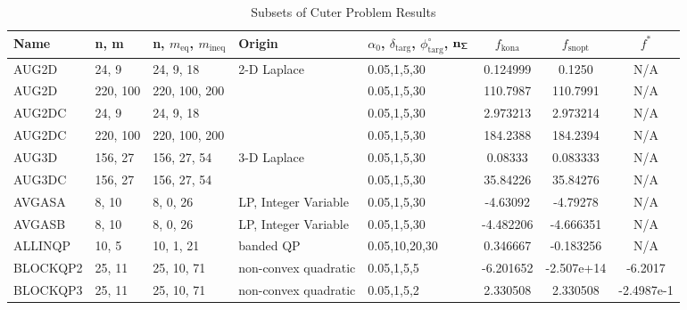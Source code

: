 \begin{landscape}
\begin{longtable}{l | l |  l  |  >{\footnotesize}p{3.5cm} | l | c | c | c  }      %
\caption{Subsets of Cuter Problem Results}\label{tab:cuter} \\
 \hline 
Name   &                 n,   m       &  n,  $m_{\text{eq}}$,  $m_{\text{ineq}}$        &     Origin      &\textbf{$\alpha_0$},  $\delta_{\text{targ}}$, $\phi^{\circ}_{\text{targ}}$,  $\mathbf{{n_{\mathsf{\Sigma}}}}$      & $ f_{\text{kona}} $   & $ f_{\text{snopt}} $ &$ f^*$    \\ \hline
AUG2D    &           24,  9         &  24,   9,  18       &    2-D Laplace   & 0.05,1,5,30   &  0.124999           &     0.1250    &      N/A                \\ \hline
AUG2D    &          220, 100   & 220, 100, 200  &                      &   0.05,1,5,30         &   110.7987          &    110.7991      &    N/A           \\ \hline
AUG2DC  &       24, 9      &   24, 9, 18       &       &     0.05,1,5,30        &    2.973213        & 2.973214    &   N/A     \\ \hline
AUG2DC  &      220, 100   &  220, 100, 200   &     &   0.05,1,5,30    & 184.2388    &   184.2394     &    N/A      \\ \hline
AUG3D  &      156, 27    & 156, 27, 54   & 3-D Laplace  &  0.05,1,5,30   & 0.08333   &   0.083333   &  N/A         \\ \hline
AUG3DC  &  156, 27  &  156, 27, 54   &    & 0.05,1,5,30 &   35.84226   &   35.84276      & N/A      \\ \hline
 AVGASA  &       8, 10   &   8, 0, 26   &   \cellcolor{blue}         LP, Integer Variable    &   0.05,1,5,30       &           -4.63092    &    -4.79278   &   N/A     \\ \hline
 AVGASB  &    8, 10  &   8, 0, 26   &   \cellcolor{blue}    LP, Integer Variable   & 0.05,1,5,30   &   -4.482206   &   -4.666351     &   N/A    \\ \hline
ALLINQP  & 10, 5   &  10, 1, 21   & banded QP  &  0.05,10,20,30 & \cellcolor{blue}0.346667  & \cellcolor{blue}-0.183256     &  N/A \\  \hline     %
BLOCKQP2   & 25, 11   & 25,  10, 71   &    non-convex quadratic & 0.05,1,5,5  & -6.201652   &  \cellcolor{yellow}  -2.507e+14    &  \cellcolor{yellow}  -6.2017   \\ \hline
BLOCKQP3   & 25, 11   & 25,  10, 71  & non-convex quadratic  	  & 0.05,1,5,2 & \cellcolor{blue} 2.330508     &  \cellcolor{blue}2.330508   &            \cellcolor{blue}-2.4987e-1   \\ \hline

\end{longtable}
\end{landscape}
